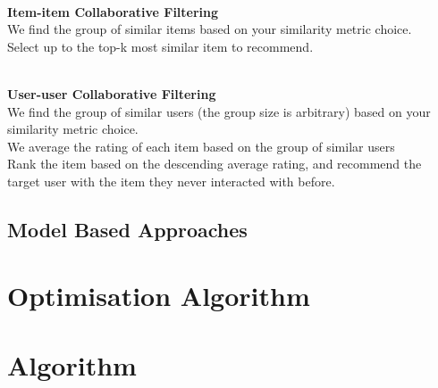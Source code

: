 \\\textbf{Item-item Collaborative Filtering}
\\We find the group of similar items based on your similarity metric choice.
\\Select up to the top-k most similar item to recommend.


\\\textbf{User-user Collaborative Filtering}
\\We find the group of similar users (the group size is arbitrary) based on your similarity metric choice.
\\We average the rating of each item based on the group of similar users
\\Rank the item based on the descending average rating, and recommend the target user with the item they never interacted with before.






\subsection{Model Based Approaches}

\section*{Optimisation Algorithm}

\section*{Algorithm}
 

